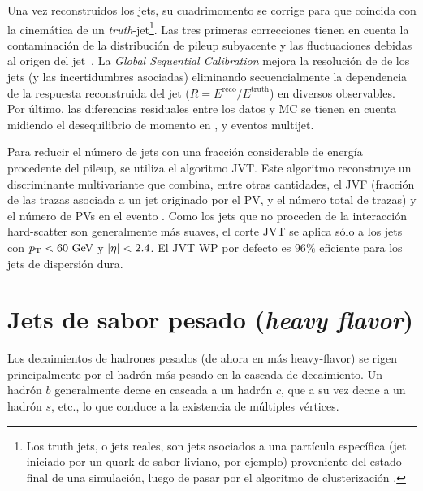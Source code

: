 Una vez reconstruidos los jets, su cuadrimomento se corrige para que coincida con la cinemática de un \textit{truth}-jet\footnote{Los truth jets, o jets reales, son jets asociados a una part\'icula espec\'ifica (jet iniciado por un quark de sabor liviano, por ejemplo) proveniente del estado final de una simulaci\'on, luego de pasar por el algoritmo de clusterizaci\'on \antikt.}. Las tres primeras correcciones tienen en cuenta la contaminación de la distribución de pileup subyacente y las fluctuaciones debidas al origen del jet~\cite{ATLAS-Jet-Calibration-Run2}. La \textit{Global Sequential Calibration} mejora la resolución de \pt de los jets (y las incertidumbres asociadas) eliminando secuencialmente la dependencia de la respuesta reconstruida del jet (\(R= E^{\text{reco}} / E^{\text{truth}}\)) en diversos observables. Por último, las diferencias residuales entre los datos y \ac{MC} se tienen en cuenta midiendo el desequilibrio de momento en \Zjets, \gammajet y eventos multijet.

Para reducir el número de jets con una fracción considerable de energía procedente del pileup, se utiliza el algoritmo \ac{JVT}. Este algoritmo  reconstruye un discriminante multivariante que combina, entre otras cantidades, el \ac{JVF} (fracción de las trazas \pt asociada a un jet originado por el \ac{PV}, y el número total de trazas) y el número de \acp{PV} en el evento \Npv. Como los jets que no proceden de la interacción hard-scatter son generalmente más suaves, el corte \ac{JVT} se aplica sólo a los jets con \(p_{\text{T}}<60~\text{GeV}\) y \(|\eta|<2.4\). El \ac{JVT} \ac{WP} por defecto es \(96\%\) eficiente para los jets de dispersión dura.


















\section{Jets de sabor pesado (\textit{heavy flavor})}

Los decaimientos de hadrones pesados (de ahora en m\'as heavy-flavor) se rigen principalmente por el hadrón más pesado en la cascada de decaimiento. Un hadrón \(b\) generalmente decae en cascada a un hadrón \(c\), que a su vez decae a un hadrón \(s\), etc., lo que conduce a la existencia de múltiples vértices.

